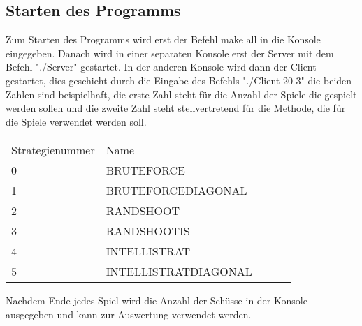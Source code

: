 \subsection{Starten des Programms}
Zum Starten des Programms wird erst der Befehl make all in die Konsole eingegeben. Danach wird in einer separaten Konsole erst der Server mit dem Befehl "./Server" gestartet. In der 
anderen Konsole wird dann der Client gestartet, dies geschieht durch die Eingabe des Befehls "./Client 20 3" die beiden Zahlen sind beispielhaft, die erste Zahl steht für die Anzahl 
der Spiele die gespielt werden sollen und die zweite Zahl steht stellvertretend für die Methode, die für die Spiele verwendet werden soll.

\begin{table}[h]
    \begin{tabular}{lllll}
     Strategienummer & Name &  &  &  \\
     0 & BRUTEFORCE &  &  &  \\
     1 & BRUTEFORCEDIAGONAL &  &  &  \\
     2 & RANDSHOOT &  &  &  \\
     3 & RANDSHOOTIS &  &  &  \\
     4 & INTELLISTRAT &  &  &  \\ 
     5 & INTELLISTRATDIAGONAL &  &  & 
    \end{tabular}
    \end{table}

Nachdem Ende jedes Spiel wird die Anzahl der Schüsse in der Konsole ausgegeben und kann zur Auswertung verwendet 
werden.


